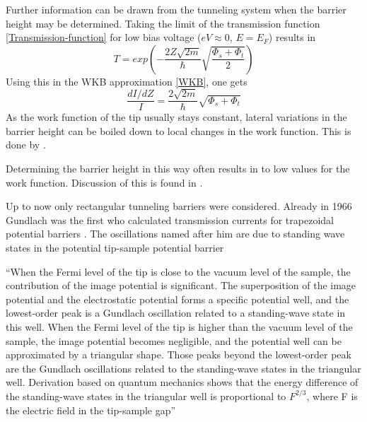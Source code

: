 Further information can be drawn from the tunneling system when the barrier height may be determined.
Taking the limit of the transmission function \eqref{Transmission-function} for low bias voltage ($eV\approx0$, $E=E_F$) results in 
$$T=exp\left(-\frac{2Z\sqrt{2m}}{\hbar}\sqrt{\frac{\Phi_s+\Phi_t}{2}}\right)$$
Using this in the WKB approximation \eqref{WKB}, one gets $$\frac{dI/dZ}{I}=\frac{2\sqrt{2m}}{\hbar}\sqrt{\Phi_s+\Phi_t}$$
As the work function of the tip usually stays constant, lateral variations in the barrier height can be boiled down to local changes in the work function. This is done by \cite{jia_variation_1998}.

Determining the barrier height in this way often results in to low values for the work function. Discussion of this is found in \cite[96]{bonnell_scanning_1993}.

Up to now only rectangular tunneling barriers were considered.
Already in 1966 Gundlach was the first who calculated transmission currents for trapezoidal potential barriers \cite{gundlach_zur_1966}. The oscillations named after him are due to standing wave states in the potential tip-sample potential barrier \cite{binnig_tunneling_1985,becker_electron_1985}

``When the Fermi level of the tip is close to the vacuum level of  the  sample,  the  contribution  of  the  image  potential  is significant. The superposition of the  image  potential  and the electrostatic  potential forms a specific potential well, and the lowest-order peak is a Gundlach oscillation related to a standing-wave state in this well. When the Fermi level of the tip is higher than the vacuum level of the sample, the image potential becomes negligible, and the potential well can be  approximated  by a triangular  shape. Those peaks beyond the lowest-order peak are the Gundlach oscillations related to the standing-wave states in the triangular well. Derivation  based  on  quantum  mechanics  shows  that  the energy difference of the standing-wave states in the triangular  well  is  proportional  to $F^{2/3}$,  where F is  the electric field in the tip-sample gap''\cite{lin_manifestation_2007}

